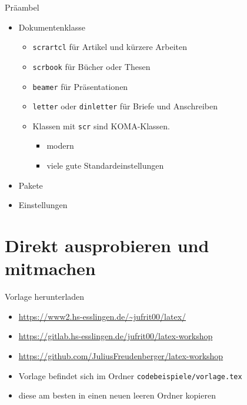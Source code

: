 \documentclass[presentation,aspectratio=169]{beamer}
\begin{document}
\begin{frame}[fragile]{Präambel}
  \begin{itemize}
    \item Dokumentenklasse
      \begin{itemize}
        \item \verb|scrartcl| für Artikel und kürzere Arbeiten
        \item \verb|scrbook| für Bücher oder Thesen
        \item \verb|beamer| für Präsentationen
        \item \verb|letter| oder \verb|dinletter| für Briefe und Anschreiben
        \item Klassen mit \verb|scr| sind KOMA-Klassen.
          \begin{itemize}
            \item modern
            \item viele gute Standardeinstellungen
          \end{itemize}
      \end{itemize}
    \item Pakete
    \item Einstellungen
  \end{itemize}
\end{frame}

\section{Direkt ausprobieren und mitmachen}

\begin{frame}[fragile]{Vorlage herunterladen}
  \begin{itemize}
    \item \href{https://www2.hs-esslingen.de/~jufrit00/latex/}{https://www2.hs-esslingen.de/\textasciitilde{}jufrit00/latex/}
    \item \href{https://gitlab.hs-esslingen.de/jufrit00/latex-workshop}{https://gitlab.hs-esslingen.de/jufrit00/latex-workshop}
    \item \href{https://github.com/JuliusFreudenberger/latex-workshop}{https://github.com/JuliusFreudenberger/latex-workshop}
      \bigskip
    \item Vorlage befindet sich im Ordner \verb|codebeispiele/vorlage.tex|
    \item diese am besten in einen neuen leeren Ordner kopieren
  \end{itemize}
\end{frame}
\end{document}

